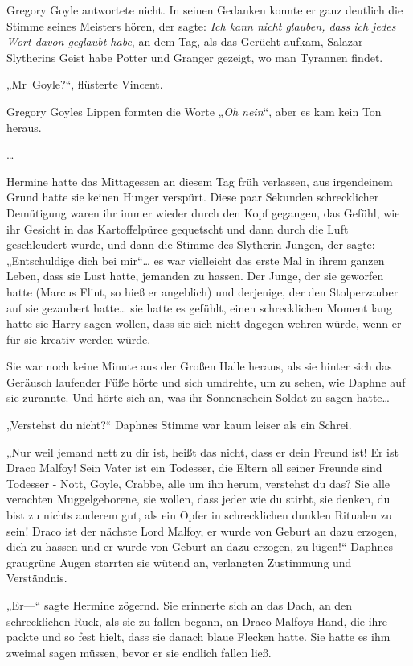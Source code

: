 {Gregory Goyle antwortete nicht. In seinen Gedanken konnte er ganz deutlich die Stimme seines Meisters hören, der sagte: \emph{Ich kann nicht glauben, dass ich jedes Wort davon geglaubt habe}, an dem Tag, als das Gerücht aufkam, Salazar Slytherins Geist habe Potter und Granger gezeigt, wo man Tyrannen findet.

„Mr~Goyle?“, flüsterte Vincent.

Gregory Goyles Lippen formten die Worte „\emph{Oh nein}“, aber es kam kein Ton heraus.

…

Hermine hatte das Mittagessen an diesem Tag früh verlassen, aus irgendeinem Grund hatte sie keinen Hunger verspürt. Diese paar Sekunden schrecklicher Demütigung waren ihr immer wieder durch den Kopf gegangen, das Gefühl, wie ihr Gesicht in das Kartoffelpüree gequetscht und dann durch die Luft geschleudert wurde, und dann die Stimme des Slytherin-Jungen, der sagte: „Entschuldige dich bei mir“… es war vielleicht das erste Mal in ihrem ganzen Leben, dass sie Lust hatte, jemanden zu hassen. Der Junge, der sie geworfen hatte (Marcus Flint, so hieß er angeblich) und derjenige, der den Stolperzauber auf sie gezaubert hatte… sie hatte es gefühlt, einen schrecklichen Moment lang hatte sie Harry sagen wollen, dass sie sich nicht dagegen wehren würde, wenn er für sie kreativ werden würde.

Sie war noch keine Minute aus der Großen Halle heraus, als sie hinter sich das Geräusch laufender Füße hörte und sich umdrehte, um zu sehen, wie Daphne auf sie zurannte. Und hörte sich an, was ihr Sonnenschein-Soldat zu sagen hatte…

„Verstehst du nicht?“ Daphnes Stimme war kaum leiser als ein Schrei.

„Nur weil jemand nett zu dir ist, heißt das nicht, dass er dein Freund ist! Er ist Draco Malfoy! Sein Vater ist ein Todesser, die Eltern all seiner Freunde sind Todesser - Nott, Goyle, Crabbe, alle um ihn herum, verstehst du das? Sie alle verachten Muggelgeborene, sie wollen, dass jeder wie du stirbt, sie denken, du bist zu nichts anderem gut, als ein Opfer in schrecklichen dunklen Ritualen zu sein! Draco ist der nächste Lord Malfoy, er wurde von Geburt an dazu erzogen, dich zu hassen und er wurde von Geburt an dazu erzogen, zu lügen!“ Daphnes graugrüne Augen starrten sie wütend an, verlangten Zustimmung und Verständnis.

„Er—“ sagte Hermine zögernd. Sie erinnerte sich an das Dach, an den schrecklichen Ruck, als sie zu fallen begann, an Draco Malfoys Hand, die ihre packte und so fest hielt, dass sie danach blaue Flecken hatte. Sie hatte es ihm zweimal sagen müssen, bevor er sie endlich fallen ließ.

}
